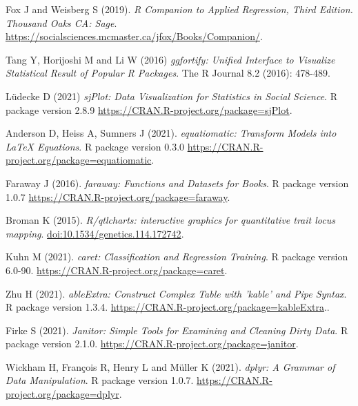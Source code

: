 \begin{thebibliography}{3}
Fox J and Weisberg S (2019).
\newblock \emph{R Companion to Applied
Regression, Third Edition. Thousand Oaks CA: Sage}.
\newblock \urlprefix\url{https://socialsciences.mcmaster.ca/jfox/Books/Companion/}.

Tang Y, Horijoshi M and Li W (2016)
\newblock \emph{ggfortify: Unified
Interface to Visualize Statistical Result of Popular R Packages}.
\newblock The R Journal 8.2 (2016): 478-489.

\bibitem[{Lüdecke D (2021)}]{}
Lüdecke D (2021)
\newblock \emph{sjPlot: Data Visualization for Statistics in
Social Science}.
\newblock R package version 2.8.9 \urlprefix\url{https://CRAN.R-project.org/package=sjPlot}.

Anderson D, Heiss A, Sumners J (2021).
\newblock \emph{equatiomatic: Transform Models into LaTeX Equations}.
\newblock R package version 0.3.0 \urlprefix\url{https://CRAN.R-project.org/package=equatiomatic}.

\bibitem[{Faraway J (2016)}]{}
Faraway J (2016).
\newblock \emph{faraway: Functions and Datasets for Books}.
\newblock R package version 1.0.7 \urlprefix\url{https://CRAN.R-project.org/package=faraway}.

\bibitem[{Broman K(2015)}]{}
Broman K (2015).
\newblock \emph{R/qtlcharts: interactive graphics for
quantitative trait locus mapping}.
\newblock \urlprefix\url{doi:10.1534/genetics.114.172742}.

\bibitem[{Kuhn M (2021)}]{}
Kuhn M (2021).
\newblock \emph{caret: Classification and Regression Training}.
\newblock R package version 6.0-90. \urlprefix\url{https://CRAN.R-project.org/package=caret}.

\bibitem[{Zhu H (2021)}]{}
Zhu H (2021).
\newblock \emph{ableExtra: Construct Complex Table with 'kable' and Pipe Syntax}.
\newblock R package version 1.3.4. \urlprefix\url{https://CRAN.R-project.org/package=kableExtra}..

\bibitem[{Firke S (2021)}]{}
Firke S (2021).
\newblock \emph{Janitor: Simple Tools for Examining and Cleaning Dirty Data}.
\newblock R package version 2.1.0. \urlprefix\url{https://CRAN.R-project.org/package=janitor}.

Wickham H, François R, Henry L and Müller K (2021).
\newblock \emph{dplyr: A Grammar of Data Manipulation}.
\newblock R package version 1.0.7. \urlprefix\url{https://CRAN.R-project.org/package=dplyr}.


\end{thebibliography}
